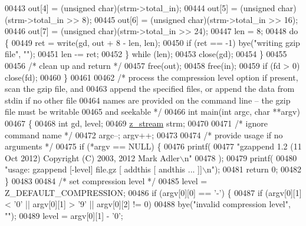 \begin{DoxyCode}
{{{00443         out[4] = (\textcolor{keywordtype}{unsigned} char)(strm->total\_in);
00444         out[5] = (\textcolor{keywordtype}{unsigned} char)(strm->total\_in >> 8);
00445         out[6] = (\textcolor{keywordtype}{unsigned} char)(strm->total\_in >> 16);
00446         out[7] = (\textcolor{keywordtype}{unsigned} char)(strm->total\_in >> 24);
00447         len = 8;
00448         \textcolor{keywordflow}{do} \{
00449             ret = write(gd, out + 8 - len, len);
00450             \textcolor{keywordflow}{if} (ret == -1) bye(\textcolor{stringliteral}{"writing gzip file"}, \textcolor{stringliteral}{""});
00451             len -= ret;
00452         \} \textcolor{keywordflow}{while} (len);
00453         close(gd);
00454     \}
00455 
00456     \textcolor{comment}{/* clean up and return */}
00457     free(out);
00458     free(in);
00459     \textcolor{keywordflow}{if} (fd > 0) close(fd);
00460 \}
00461 
00462 \textcolor{comment}{/* process the compression level option if present, scan the gzip file, and}
00463 \textcolor{comment}{   append the specified files, or append the data from stdin if no other file}
00464 \textcolor{comment}{   names are provided on the command line -- the gzip file must be writable}
00465 \textcolor{comment}{   and seekable */}
00466 \textcolor{keywordtype}{int} main(\textcolor{keywordtype}{int} argc, \textcolor{keywordtype}{char} **argv)
00467 \{
00468     \textcolor{keywordtype}{int} gd, level;
00469     \hyperlink{structz__stream__s}{z\_stream} strm;
00470 
00471     \textcolor{comment}{/* ignore command name */}
00472     argc--; argv++;
00473 
00474     \textcolor{comment}{/* provide usage if no arguments */}
00475     \textcolor{keywordflow}{if} (*argv == NULL) \{
00476         printf(
00477             \textcolor{stringliteral}{"gzappend 1.2 (11 Oct 2012) Copyright (C) 2003, 2012 Mark Adler\(\backslash\)n"}
00478                );
00479         printf(
00480             \textcolor{stringliteral}{"usage: gzappend [-level] file.gz [ addthis [ andthis ... ]]\(\backslash\)n"});
00481         \textcolor{keywordflow}{return} 0;
00482     \}
00483 
00484     \textcolor{comment}{/* set compression level */}
00485     level = Z\_DEFAULT\_COMPRESSION;
00486     \textcolor{keywordflow}{if} (argv[0][0] == \textcolor{charliteral}{'-'}) \{
00487         \textcolor{keywordflow}{if} (argv[0][1] < \textcolor{charliteral}{'0'} || argv[0][1] > \textcolor{charliteral}{'9'} || argv[0][2] != 0)
00488             bye(\textcolor{stringliteral}{"invalid compression level"}, \textcolor{stringliteral}{""});
00489         level = argv[0][1] - \textcolor{charliteral}{'0'};
}}}
\end{DoxyCode}

